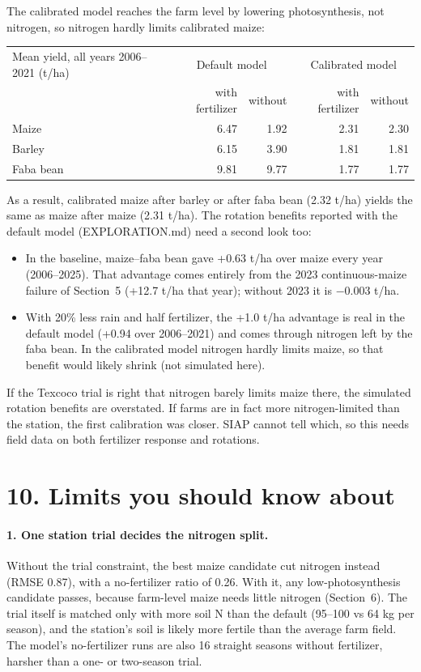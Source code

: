 \documentclass[11pt,a4paper]{article}
\begin{document}
The calibrated model reaches the farm level by lowering photosynthesis, not nitrogen, so nitrogen hardly limits
calibrated maize:
\begin{center}\small
\begin{tabular}{lrrrr}
\toprule
Mean yield, all years 2006--2021 (t/ha) & \multicolumn{2}{c}{Default model} & \multicolumn{2}{c}{Calibrated model} \\
 & with fertilizer & without & with fertilizer & without \\
\midrule
Maize & 6.47 & 1.92 & 2.31 & 2.30 \\
Barley & 6.15 & 3.90 & 1.81 & 1.81 \\
Faba bean & 9.81 & 9.77 & 1.77 & 1.77 \\
\bottomrule
\end{tabular}
\end{center}
As a result, calibrated maize after barley or after faba bean (2.32 t/ha) yields the same as maize after maize
(2.31 t/ha). The rotation benefits reported with the default model (EXPLORATION.md) need a second look too:
\begin{itemize}[nosep]
  \item In the baseline, maize--faba bean gave +0.63 t/ha over maize every year (2006--2025). That advantage comes
        entirely from the 2023 continuous-maize failure of Section~5 (+12.7 t/ha that year); without 2023 it is
        \(-0.003\) t/ha.
  \item With 20\% less rain and half fertilizer, the +1.0 t/ha advantage is real in the default model (+0.94 over
        2006--2021) and comes through nitrogen left by the faba bean. In the calibrated model nitrogen hardly limits
        maize, so that benefit would likely shrink (not simulated here).
\end{itemize}
If the Texcoco trial is right that nitrogen barely limits maize there, the simulated rotation benefits are
overstated. If farms are in fact more nitrogen-limited than the station, the first calibration was closer. SIAP cannot
tell which, so this needs field data on both fertilizer response and rotations.

\section*{10. Limits you should know about}

\paragraph{1. One station trial decides the nitrogen split.} Without the trial constraint, the best maize candidate
cut nitrogen instead (RMSE 0.87), with a no-fertilizer ratio of 0.26. With it, any low-photosynthesis candidate passes,
because farm-level maize needs little nitrogen (Section~6). The trial itself is matched only with more soil N than the
default (95--100 vs 64 kg per season), and the station's soil is likely more fertile than the average farm field. The
model's no-fertilizer runs are also 16 straight seasons without fertilizer, harsher than a one- or two-season trial.
\end{document}
